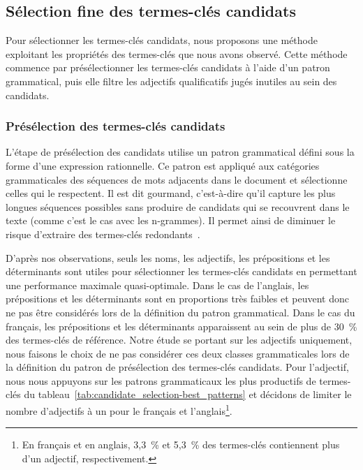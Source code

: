     \subsection{Sélection fine des termes-clés candidats}
    \label{subsec:main:domain_independent_keyphrase_extraction-keyphrase_candidate_selection-modifiers_filtering}
      Pour sélectionner les termes-clés candidats, nous proposons une méthode
      exploitant les propriétés des termes-clés que nous avons observé. Cette
      méthode commence par présélectionner les termes-clés candidats à l'aide
      d'un patron grammatical, puis elle filtre les adjectifs qualificatifs
      jugés inutiles au sein des candidats.

      \subsubsection{Présélection des termes-clés candidats}
      \label{subsubsec:main:domain_independent_keyphrase_extraction-keyphrase_candidate_selection-modifiers_filtering-candidate_pre_selection}
        L'étape de présélection des candidats utilise un patron grammatical
        défini sous la forme d'une expression rationnelle. Ce patron est
        appliqué aux catégories grammaticales des séquences de mots adjacents
        dans le document et sélectionne celles qui le respectent. Il est dit
        \og{}gourmand\fg{}, c'est-à-dire qu'il capture les plus longues
        séquences possibles sans produire de candidats qui se recouvrent dans le
        texte (comme c'est le cas avec les n-grammes). Il permet ainsi de
        diminuer le risque d'extraire des termes-clés
        redondants~\cite{hasan2014state_of_the_art}.

        D'après nos observations, seuls les noms, les adjectifs, les
        prépositions et les déterminants sont utiles pour sélectionner les
        termes-clés candidats en permettant une performance maximale
        quasi-optimale. Dans le cas de l'anglais, les prépositions et les
        déterminants sont en proportions très faibles et peuvent donc ne pas
        être considérés lors de la définition du patron grammatical. Dans le cas
        du français, les prépositions et les déterminants apparaissent au sein
        de plus de 30~\% des termes-clés de référence. Notre étude se portant
        sur les adjectifs uniquement, nous faisons le choix de ne pas considérer
        ces deux classes grammaticales lors de la définition du patron de
        présélection des termes-clés candidats. Pour l'adjectif, nous nous
        appuyons sur les patrons grammaticaux les plus productifs de termes-clés
        du tableau~\ref{tab:candidate_selection-best_patterns} et décidons de
        limiter le nombre d'adjectifs à un pour le français et
        l'anglais\footnote{En français et en anglais, 3,3~\% et 5,3~\% des
        termes-clés contiennent plus d'un adjectif, respectivement.}.
        
